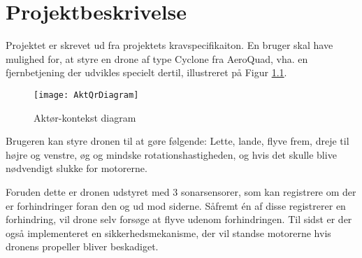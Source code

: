 \documentclass[Main]{subfiles}
\begin{document}
		
	

\chapter{Projektbeskrivelse}

Projektet er skrevet ud fra projektets kravspecifikaiton\cite[p. 18-23]{Kravspec}.
En bruger skal have mulighed for, at styre en drone af type Cyclone fra AeroQuad\cite{AQ-store}, vha. en fjernbetjening der udvikles specielt dertil, illustreret på Figur \ref{Fig:Aktor-oversigt}.

\begin{figure}[H]
\centering
\texttt{[image: AktQrDiagram]}
\caption{Aktør-kontekst diagram}
\label{Fig:Aktor-oversigt}
\end{figure}

Brugeren kan styre dronen til at gøre følgende: Lette, lande, flyve frem, dreje til højre og venstre, øg og mindske rotationshastigheden, og hvis det skulle blive nødvendigt slukke for motorerne.

Foruden dette er dronen udstyret med 3 sonarsensorer, som kan registrere om der er forhindringer foran den og ud mod siderne.
Såfremt én af disse registrerer en forhindring, vil drone selv forsøge at flyve udenom forhindringen.
Til sidst er der også implementeret en sikkerhedsmekanisme, der vil standse motorerne hvis dronens propeller bliver beskadiget.
\end{document}
